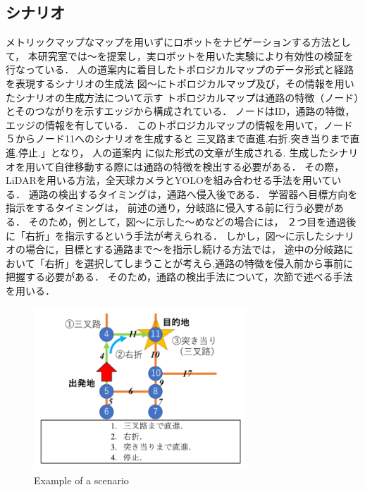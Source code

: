 \documentclass{jarticle}
\begin{document}
\subsection{シナリオ}
メトリックマップなマップを用いずにロボットをナビゲーションする方法として，
本研究室では〜を提案し，実ロボットを用いた実験により有効性の検証を行なっている．
人の道案内に着目したトポロジカルマップのデータ形式と経路を表現するシナリオの生成法
図〜にトポロジカルマップ及び，その情報を用いたシナリオの生成方法について示す
トポロジカルマップは通路の特徴（ノード）とそのつながりを示すエッジから構成されている．
ノードはID，通路の特徴，エッジの情報を有している．
このトポロジカルマップの情報を用いて，ノード５からノード11へのシナリオを生成すると
三叉路まで直進.右折.突き当りまで直進.停止.」となり，
人の道案内 に似た形式の文章が生成される.
生成したシナリオを用いて自律移動する際には通路の特徴を検出する必要がある．
その際，LiDARを用いる方法，全天球カメラとYOLOを組み合わせる手法を用いている．
通路の検出するタイミングは，通路へ侵入後である．
学習器へ目標方向を指示をするタイミングは，
前述の通り，分岐路に侵入する前に行う必要がある．
そのため，例として，図〜に示した〜めなどの場合には，
２つ目を通過後に「右折」を指示するという手法が考えられる．
しかし，図〜に示したシナリオの場合に，目標とする通路まで〜を指示し続ける方法では，
途中の分岐路において「右折」を選択してしまうことが考えら,通路の特徴を侵入前から事前に把握する必要がある．
そのため，通路の検出手法について，次節で述べる手法を用いる．
\begin{figure}[h]
  \centering
   \includegraphics[width=80mm]{./figs/scenario.png}
   \vspace*{-4mm}
   \caption{Example of a scenario}
   \label{fig:scenario}
 \end{figure}
\end{document}
